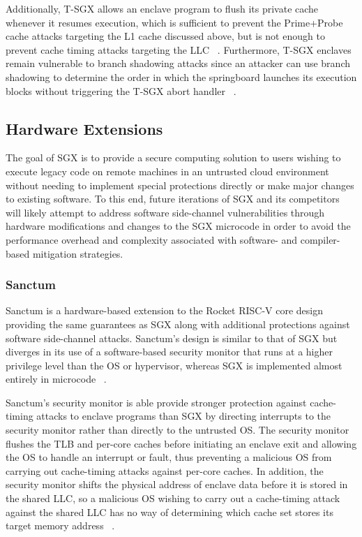 Additionally, T-SGX allows an enclave program to flush its private cache whenever it resumes execution, which is sufficient to prevent the Prime+Probe cache attacks targeting the L1 cache discussed above, but is not enough to prevent cache timing attacks targeting the LLC ~\cite{shih_t-sgx:_2017}. Furthermore, T-SGX enclaves remain vulnerable to branch shadowing attacks since an attacker can use branch shadowing to determine the order in which the springboard launches its execution blocks without triggering the T-SGX abort handler ~\cite{lee_inferring_2017}.

\subsection{Hardware Extensions}

The goal of SGX is to provide a secure computing solution to users wishing to execute legacy code on remote machines in an untrusted cloud environment without needing to implement special protections directly or make major changes to existing software. To this end, future iterations of SGX and its competitors will likely attempt to address software side-channel vulnerabilities through hardware modifications and changes to the SGX microcode in order to avoid the performance overhead and complexity associated with software- and compiler-based mitigation strategies. 

\subsubsection{Sanctum}

Sanctum is a hardware-based extension to the Rocket RISC-V core design providing the same guarantees as SGX along with additional protections against software side-channel attacks. Sanctum's design is similar to that of SGX but diverges in its use of a software-based security monitor that runs at a higher privilege level than the OS or hypervisor, whereas SGX is implemented almost entirely in microcode ~\cite{intel_corporation_intel_2016, costan_intel_2016, costan_sanctum:_2016, costan_sanctum:_2015}. 

Sanctum's security monitor is able provide stronger protection against cache-timing attacks to enclave programs than SGX by directing interrupts to the security monitor rather than directly to the untrusted OS. The security monitor flushes the TLB and per-core caches before initiating an enclave exit and allowing the OS to handle an interrupt or fault, thus preventing a malicious OS from carrying out cache-timing attacks against per-core caches. In addition, the security monitor shifts the physical address of enclave data before it is stored in the shared LLC, so a malicious OS wishing to carry out a cache-timing attack against the shared LLC has no way of determining which cache set stores its target memory address ~\cite{costan_sanctum:_2016, costan_sanctum:_2015}.

